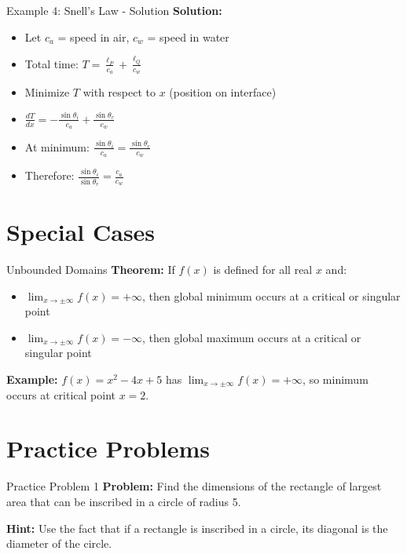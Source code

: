 \documentclass[aspectratio=169]{beamer}
\begin{document}
\begin{frame}{Example 4: Snell's Law - Solution}
\textbf{Solution:}
\begin{itemize}
    \item Let $c_a$ = speed in air, $c_w$ = speed in water
    \item Total time: $T = \frac{\ell_P}{c_a} + \frac{\ell_Q}{c_w}$
    \item Minimize $T$ with respect to $x$ (position on interface)
    \item $\frac{dT}{dx} = -\frac{\sin \theta_i}{c_a} + \frac{\sin \theta_r}{c_w}$
    \item At minimum: $\frac{\sin \theta_i}{c_a} = \frac{\sin \theta_r}{c_w}$
    \item Therefore: $\frac{\sin \theta_i}{\sin \theta_r} = \frac{c_a}{c_w}$
\end{itemize}
\end{frame}

\section{Special Cases}

\begin{frame}{Unbounded Domains}
\textbf{Theorem:} If $f(x)$ is defined for all real $x$ and:
\begin{itemize}
    \item $\lim_{x \to \pm \infty} f(x) = +\infty$, then global minimum occurs at a critical or singular point
    \item $\lim_{x \to \pm \infty} f(x) = -\infty$, then global maximum occurs at a critical or singular point
\end{itemize}

\textbf{Example:} $f(x) = x^2 - 4x + 5$ has $\lim_{x \to \pm \infty} f(x) = +\infty$, so minimum occurs at critical point $x = 2$.
\end{frame}

\section{Practice Problems}

\begin{frame}{Practice Problem 1}
\textbf{Problem:} Find the dimensions of the rectangle of largest area that can be inscribed in a circle of radius 5.

\textbf{Hint:} Use the fact that if a rectangle is inscribed in a circle, its diagonal is the diameter of the circle.
\end{frame}
\end{document}
